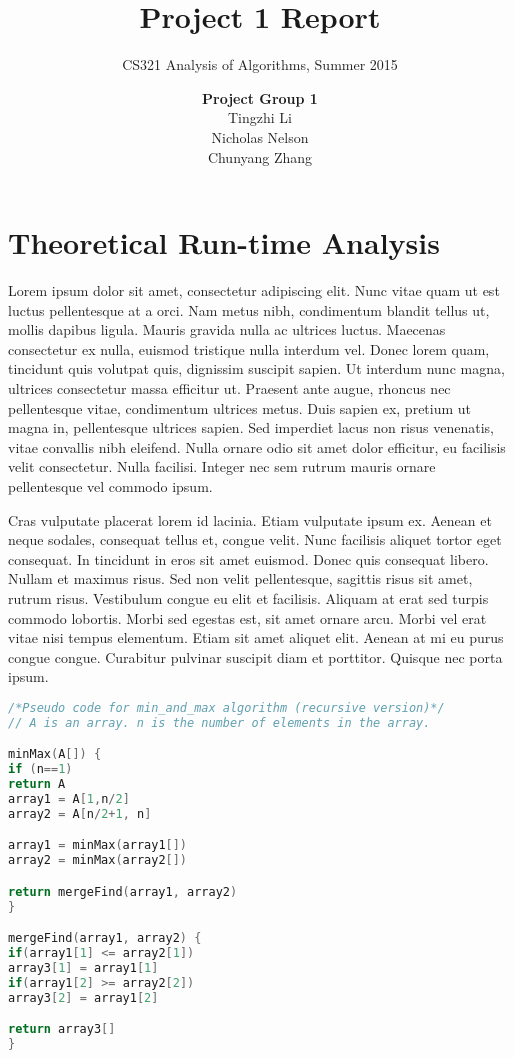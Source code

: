 \documentclass[11pt]{scrreprt}
\title{\textbf{Project 1 Report}}
\subtitle{CS321 Analysis of Algorithms, Summer 2015}
\author{\textbf{Project Group 1}\\
		Tingzhi Li\\
		Nicholas Nelson\\
		Chunyang Zhang}
\date{}
\begin{document}
\maketitle

\chapter{Theoretical Run-time Analysis}

Lorem ipsum dolor sit amet, consectetur adipiscing elit. Nunc vitae quam ut est luctus pellentesque at a orci. Nam metus nibh, condimentum blandit tellus ut, mollis dapibus ligula. Mauris gravida nulla ac ultrices luctus. Maecenas consectetur ex nulla, euismod tristique nulla interdum vel. Donec lorem quam, tincidunt quis volutpat quis, dignissim suscipit sapien. Ut interdum nunc magna, ultrices consectetur massa efficitur ut. Praesent ante augue, rhoncus nec pellentesque vitae, condimentum ultrices metus. Duis sapien ex, pretium ut magna in, pellentesque ultrices sapien. Sed imperdiet lacus non risus venenatis, vitae convallis nibh eleifend. Nulla ornare odio sit amet dolor efficitur, eu facilisis velit consectetur. Nulla facilisi. Integer nec sem rutrum mauris ornare pellentesque vel commodo ipsum.

Cras vulputate placerat lorem id lacinia. Etiam vulputate ipsum ex. Aenean et neque sodales, consequat tellus et, congue velit. Nunc facilisis aliquet tortor eget consequat. In tincidunt in eros sit amet euismod. Donec quis consequat libero. Nullam et maximus risus. Sed non velit pellentesque, sagittis risus sit amet, rutrum risus. Vestibulum congue eu elit et facilisis. Aliquam at erat sed turpis commodo lobortis. Morbi sed egestas est, sit amet ornare arcu. Morbi vel erat vitae nisi tempus elementum. Etiam sit amet aliquet elit. Aenean at mi eu purus congue congue. Curabitur pulvinar suscipit diam et porttitor. Quisque nec porta ipsum. 

\begin{lstlisting}[language=c]
/*Pseudo code for min_and_max algorithm (recursive version)*/
// A is an array. n is the number of elements in the array.

minMax(A[]) {
if (n==1)
return A
array1 = A[1,n/2]
array2 = A[n/2+1, n]

array1 = minMax(array1[])
array2 = minMax(array2[])

return mergeFind(array1, array2)
}

mergeFind(array1, array2) {
if(array1[1] <= array2[1])
array3[1] = array1[1]
if(array1[2] >= array2[2])
array3[2] = array1[2]

return array3[]
}

\end{lstlisting}
\end{document}
